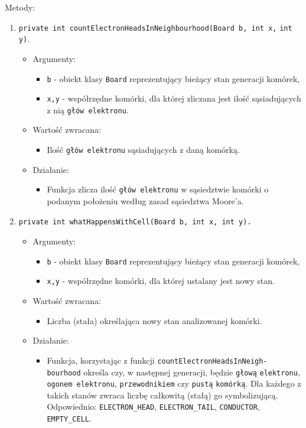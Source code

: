 \documentclass[a4paper,11pt, notitlepage ]{article}
\begin{document}
Metody:
\begin{enumerate}
\item \verb+private int countElectronHeadsInNeighbourhood(Board b, int x,+ \verb+int y)+.
\begin{itemize}
\item Argumenty:
\begin{itemize}
\item \verb+b+  - obiekt klasy \verb+Board+ reprezentujący bieżący stan generacji komórek,
\item \verb+x,y+ - współrzędne komórki, dla której zliczana jest ilość sąsiadujących z nią \verb+głów elektronu+.
\end{itemize}
\item Wartość zwracana:
\begin{itemize}
\item Ilość \verb+głów elektronu+ sąsiadujących z daną komórką.
\end{itemize}
\item Działanie:
\begin{itemize}
\item Funkcja zlicza ilość \verb+głów elektronu+ w sąsiedztwie komórki o podanym położeniu według zasad sąsiedztwa Moore'a.
\end{itemize}
\end{itemize}	

\item \begin{verbatim}private int whatHappensWithCell(Board b, int x, int y). \end{verbatim}
\begin{itemize}
\item Argumenty:
\begin{itemize}
\item \verb+b+  - obiekt klasy \verb+Board+ reprezentujący bieżący stan generacji komórek,
\item \verb+x,y+ - współrzędne komórki, dla której ustalany jest nowy stan.
\end{itemize}
\item Wartość zwracana:
\begin{itemize}
\item Liczba (stała) określająca nowy stan analizowanej komórki.
\end{itemize}
\item Działanie:
\begin{itemize}
\item Funkcja, korzystając z funkcji \verb+countElectronHeadsInNeigh-+ \verb+bourhood+ określa czy, w następnej generacji, będzie \verb+głową+ \verb+elektronu+, \verb+ogonem elektronu+, \verb+przewodnikiem+ czy \verb+pustą+ \verb+komórką+. Dla każdego z takich stanów zwraca liczbę całkowitą (stałą) go symbolizującą. Odpowiednio: \verb+ELECTRON_HEAD+, \verb+ELECTRON_TAIL+, \verb+CONDUCTOR+, \verb+EMPTY_CELL+.
\end{itemize}
\end{itemize}



\end{enumerate}
\end{document}
